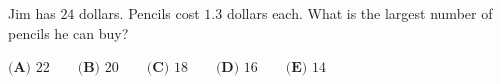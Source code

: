 Jim has \(24\) dollars. Pencils cost \(1.3\) dollars each. What is the largest number of pencils he can buy?

\(\textbf{(A) } 22 \qquad\textbf{(B) } 20 \qquad\textbf{(C) } 18 \qquad\textbf{(D) } 16 \qquad\textbf{(E) } 14\)

